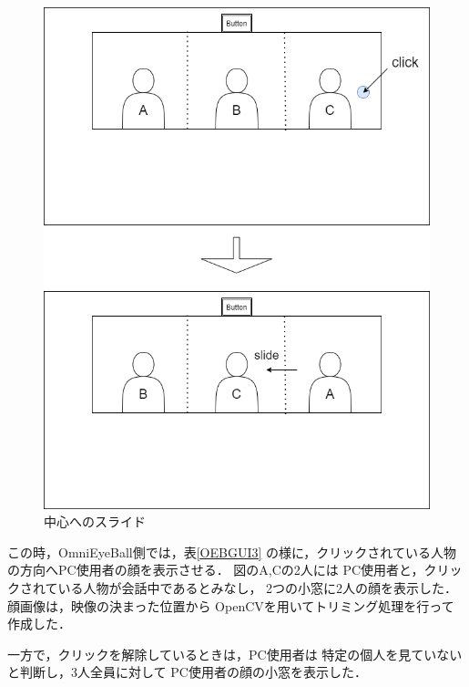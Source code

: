 \begin{figure}[tbp]
  \centering
  \includegraphics[scale=0.7]{fig/GUI2.png}
  \caption{中心へのスライド}\label{GUI2}
\end{figure}

この時，OmniEyeBall側では，表\ref{OEBGUI3}
の様に，クリックされている人物の方向へPC使用者の顔を表示させる．
図のA,Cの2人には
PC使用者と，クリックされている人物が会話中であるとみなし，
2つの小窓に2人の顔を表示した．顔画像は，映像の決まった位置から
OpenCVを用いてトリミング処理を行って作成した．

一方で，クリックを解除しているときは，PC使用者は
特定の個人を見ていないと判断し，3人全員に対して
PC使用者の顔の小窓を表示した．

